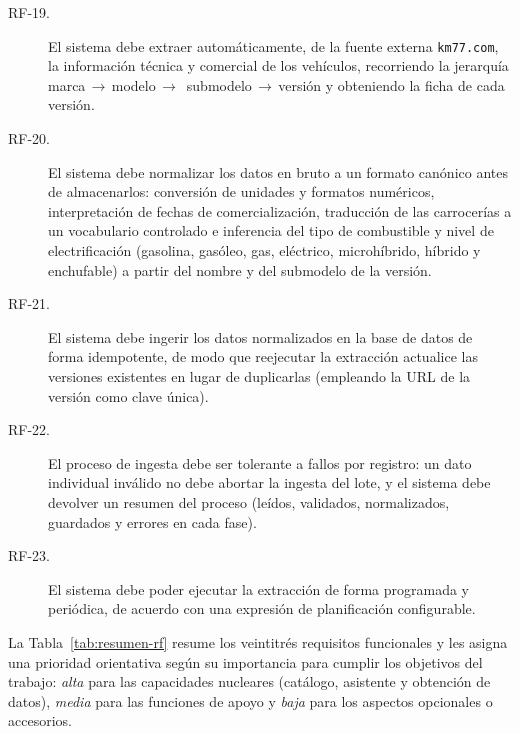 \begin{description}
  \item[RF-19.] El sistema debe extraer automáticamente, de la fuente externa
        \texttt{km77.com}, la información técnica y comercial de los vehículos,
        recorriendo la jerarquía marca\,$\rightarrow$\,modelo\,$\rightarrow$\,%
        submodelo\,$\rightarrow$\,versión y obteniendo la ficha de cada
        versión.

  \item[RF-20.] El sistema debe normalizar los datos en bruto a un formato
        canónico antes de almacenarlos: conversión de unidades y formatos
        numéricos, interpretación de fechas de comercialización, traducción de
        las carrocerías a un vocabulario controlado e inferencia del tipo de
        combustible y nivel de electrificación (gasolina, gasóleo, gas,
        eléctrico, microhíbrido, híbrido y enchufable) a partir del nombre y
        del submodelo de la versión.

  \item[RF-21.] El sistema debe ingerir los datos normalizados en la base de
        datos de forma idempotente, de modo que reejecutar la extracción
        actualice las versiones existentes en lugar de duplicarlas (empleando
        la URL de la versión como clave única).

  \item[RF-22.] El proceso de ingesta debe ser tolerante a fallos por registro:
        un dato individual inválido no debe abortar la ingesta del lote, y el
        sistema debe devolver un resumen del proceso (leídos, validados,
        normalizados, guardados y errores en cada fase).

  \item[RF-23.] El sistema debe poder ejecutar la extracción de forma
        programada y periódica, de acuerdo con una expresión de planificación
        configurable.
\end{description}

La Tabla~\ref{tab:resumen-rf} resume los veintitrés requisitos funcionales y les
asigna una prioridad orientativa según su importancia para cumplir los objetivos
del trabajo: \emph{alta} para las capacidades nucleares (catálogo, asistente y
obtención de datos), \emph{media} para las funciones de apoyo y \emph{baja} para
los aspectos opcionales o accesorios.

